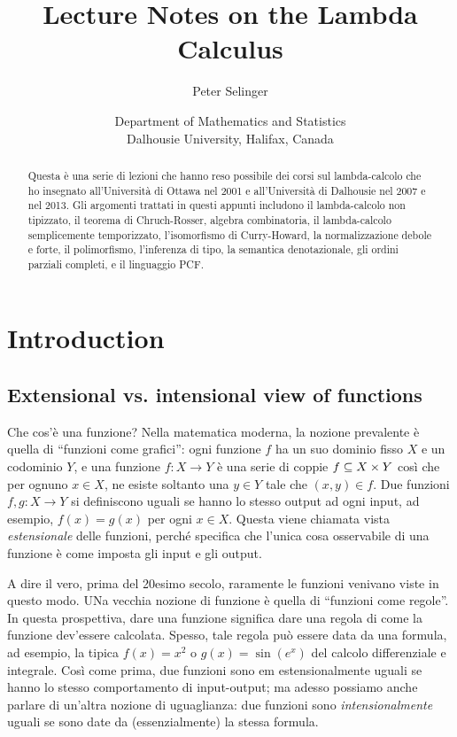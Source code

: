 \documentclass{article}
\title{Lecture Notes on the Lambda Calculus}
\author{Peter Selinger}
\date{Department of Mathematics and Statistics\\
  Dalhousie University, Halifax, Canada}
\begin{document}
\maketitle

\begin{abstract}
Questa \`e una serie di lezioni che hanno reso possibile dei corsi sul 
lambda-calcolo che ho insegnato all'Universit\`a di Ottawa nel 2001 e 
all'Universit\`a di Dalhousie nel 2007 e nel 2013. Gli argomenti trattati 
in questi appunti includono il lambda-calcolo non tipizzato, il teorema 
di Chruch-Rosser, algebra combinatoria, il lambda-calcolo semplicemente 
temporizzato, l'isomorfismo di Curry-Howard, la normalizzazione debole 
e forte, il polimorfismo, l'inferenza di tipo, la semantica denotazionale, 
gli ordini parziali completi, e il linguaggio PCF.
\end{abstract}

\tableofcontents

\newpage

\section{Introduction}\label{sec-intro}

\subsection{Extensional vs. intensional view of functions}
\label{subsec-intro1}

Che cos'\`e una funzione? Nella matematica moderna, la nozione prevalente
\`e quella di ``funzioni come grafici'': ogni funzione $f$ ha un suo dominio
fisso $X$ e un codominio $Y$, e una funzione $f:X\to Y$ \`e una serie di coppie
$f\subseteq X\times Y$ cos\`i che per ognuno $x\in X$, ne esiste soltanto
una $y\in Y$ tale che $(x,y)\in f$. Due funzioni $f,g:X\to Y$ si
definiscono uguali se hanno lo stesso output ad ogni input, ad esempio,
$f(x)=g(x)$ per ogni $x\in X$. Questa viene chiamata vista {\em estensionale}
delle funzioni, perché specifica che l'unica cosa osservabile 
di una funzione \`e come imposta gli input e gli output.

A dire il vero, prima del 20esimo secolo, raramente le funzioni venivano
viste in questo modo. UNa vecchia nozione di funzione \`e quella di ``funzioni come 
regole''. In questa prospettiva, dare una funzione significa dare una regola di
come la funzione dev'essere calcolata. Spesso, tale regola può essere data da
una formula, ad esempio, la tipica $f(x)=x^2$ o $g(x)=\sin(e^x)$
del calcolo differenziale e integrale. Cos\`i come prima, due funzioni
sono {em estensionalmente} uguali se hanno lo stesso comportamento di input-output;
ma adesso possiamo anche parlare di un'altra nozione di uguaglianza: due funzioni sono
{\em intensionalmente} uguali se sono date da (essenzialmente) la
stessa formula.
\end{document}
